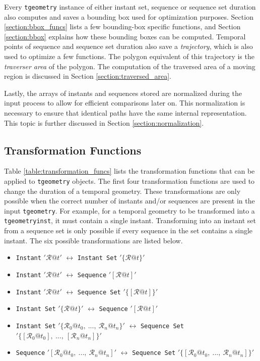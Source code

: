 Every \lstinline+tgeometry+ instance of either instant set, sequence or sequence set duration also computes and saves a bounding box used for optimization purposes. Section \ref{section:bbox_funcs} lists a few bounding-box specific functions, and Section \ref{section:bbox} explains how these bounding boxes can be computed. Temporal points of sequence and sequence set duration also save a \textit{trajectory}, which is also used to optimize a few functions. The polygon equivalent of this trajectory is the \textit{traverser area} of the polygon. The computation of the traversed area of a moving region is discussed in Section \ref{section:traversed_area}.

Lastly, the arrays of instants and sequences stored are normalized during the input process to allow for efficient comparisons later on. This normalization is necessary to ensure that identical paths have the same internal representation. This topic is further discussed in Section \ref{section:normalization}.

\subsection{Transformation Functions}
\label{section:transformation_funcs}

Table \ref{table:transformation_funcs} lists the transformation functions that can be applied to \lstinline+tgeometry+ objects. The first four transformation functions are used to change the duration of a temporal geometry. These transformations are only possible when the correct number of instants and/or sequences are present in the input \lstinline+tgeometry+. For example, for a temporal geometry to be transformed into a \lstinline+tgeometryinst+, it must contain a single instant. Transforming into an instant set from a sequence set is only possible if every sequence in the set contains a single instant. The six possible transformations are listed below.

\begin{itemize}
    \item \lstinline+Instant+ $'\mathcal{R}@t'$ $\leftrightarrow$ \lstinline+Instant Set+ $'\{\mathcal{R}@t\}'$
    \item \lstinline+Instant+ $'\mathcal{R}@t'$ $\leftrightarrow$ \lstinline+Sequence+ $'[\mathcal{R}@t]'$
    \item \lstinline+Instant+ $'\mathcal{R}@t'$ $\leftrightarrow$ \lstinline+Sequence Set+ $'\{[\mathcal{R}@t]\}'$
    \item \lstinline+Instant Set+ $'\{\mathcal{R}@t\}'$ $\leftrightarrow$ \lstinline+Sequence+ $'[\mathcal{R}@t]'$
    \item \lstinline+Instant Set+ $'\{\mathcal{R}_0@t_0,\ ...,\ \mathcal{R}_n@t_n\}'$ $\leftrightarrow$ \lstinline+Sequence Set+ $'\{[\mathcal{R}_0@t_0],\ ...,\ [\mathcal{R}_n@t_n]\}'$
    \item \lstinline+Sequence+ $'[\mathcal{R}_0@t_0,\ ...,\ \mathcal{R}_n@t_n]'$ $\leftrightarrow$ \lstinline+Sequence Set+ $'\{[\mathcal{R}_0@t_0,\ ...,\ \mathcal{R}_n@t_n]\}'$
\end{itemize}

